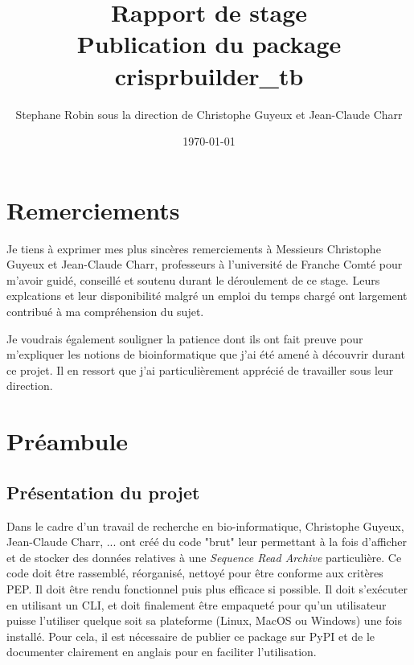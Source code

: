 \documentclass[twoside,a4paper,11pt,frenchb,openany]{report}
\title{\textbf{Rapport de stage \\ Publication du package crisprbuilder\_tb}}
\author{Stephane Robin sous la direction de Christophe Guyeux et Jean-Claude Charr}
\date{\today}
\begin{document}
	
\maketitle
	

	
	
\chapter*{Remerciements}
	
Je tiens à exprimer mes plus sincères remerciements à Messieurs Christophe Guyeux et Jean-Claude Charr, professeurs à l'université de Franche Comté pour m'avoir guidé, conseillé et soutenu durant le déroulement de ce stage. Leurs explcations et leur disponibilité malgré un emploi du temps chargé ont largement contribué à ma compréhension du sujet.

Je voudrais également souligner la patience dont ils ont fait preuve pour m'expliquer les notions de bioinformatique que j'ai été amené à découvrir durant ce projet. Il en ressort que j'ai particulièrement apprécié de travailler sous leur direction.



\tableofcontents



\chapter*{Préambule}



\section{Présentation du projet}

Dans le cadre d'un travail de recherche en bio-informatique, Christophe Guyeux, Jean-Claude Charr, ... ont créé du code "brut" leur permettant à la fois d'afficher et de stocker des données relatives à une \textit{Sequence Read Archive} particulière. Ce code doit être rassemblé, réorganisé, nettoyé pour être conforme aux critères PEP. Il doit être rendu fonctionnel puis plus efficace si possible. Il doit s'exécuter en utilisant un CLI, et doit finalement être empaqueté pour qu'un utilisateur puisse l'utiliser quelque soit sa plateforme (Linux, MacOS ou Windows) une fois installé. Pour cela, il est nécessaire de publier ce package sur PyPI et de le documenter clairement en anglais pour en faciliter l'utilisation.
\end{document}
